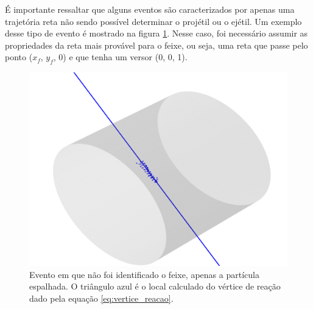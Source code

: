 \documentclass[a4paper,12pt,oneside]{book}
\begin{document}
\par É importante ressaltar que alguns eventos são caracterizados por apenas uma trajetória reta não sendo possível determinar o projétil ou o ejétil. Um exemplo desse tipo de evento é mostrado na figura \ref{fig:exemplo_sem_feixe}. Nesse caso, foi necessário assumir as propriedades da reta mais provável para o feixe, ou seja, uma reta que passe pelo ponto ($x_f$, $y_f$, 0) e que tenha um versor (0, 0, 1).


\begin{figure}[H]
    \centering
    \includegraphics[scale = 0.65]{figs/Figure_12.png}
    \caption{Evento em que não foi identificado o feixe, apenas a partícula espalhada. O triângulo azul é o local calculado do vértice de reação dado pela equação \ref{eq:vertice_reacao}.}
    \label{fig:exemplo_sem_feixe}
\end{figure}
\end{document}

